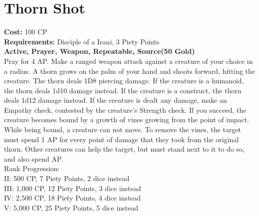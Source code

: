 \section{Thorn Shot}\label{prayer:thornShot}
\textbf{Cost:} 100 CP\\
\textbf{Requirements:} Disciple of a Irani, 3 Piety Points \\
\textbf{Active, Prayer, Weapon, Repeatable, Source(50 Gold)}\\
Pray for 4 AP. Make a ranged weapon attack against a creature of your choice in a  radius.
A thorn grows on the palm of your hand and shoots forward, hitting the creature.
The thorn deals 1D8 piercing damage.
If the creature is a humanoid, the thorn deals 1d10 damage instead.
If the creature is a construct, the thorn deals 1d12 damage instead.
If the creature is dealt any damage, make an Empathy check, contested by the creature's Strength check.
If you succeed, the creature becomes bound by a growth of vines growing from the point of impact.
While being bound, a creature can not move.
To remove the vines, the target must spend 1 AP for every point of damage that they took from the original thorn.
Other creatures can help the target, but must stand next to it to do so, and also spend AP.
\\
Rank Progression:\\
II: 500 CP, 7 Piety Points, 2 dice instead\\
III: 1,000 CP, 12 Piety Points, 3 dice instead\\
IV: 2,500 CP, 18 Piety Points, 4 dice instead\\
V: 5,000 CP, 25 Piety Points, 5 dice instead\\